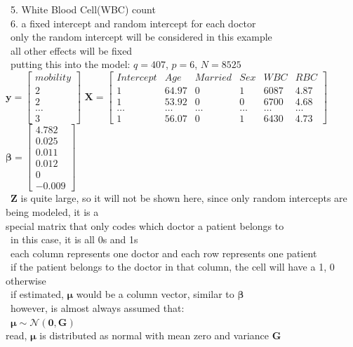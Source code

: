\documentclass[10pt,letterpaper]{scrartcl}
\newcommand{\tbul}{\textbullet}
\newcommand{\tend}{\>\textendash}
\begin{document}
\begin{tabbing}
\>\ 5. White Blood Cell(WBC) count \\
\>\ 6. a fixed intercept and random intercept for each doctor \\
\tbul\ only the random intercept will be considered in this example \\
\tbul\ all other effects will be fixed \\
\tbul\ putting this into the model: $q = 407$, $p = 6$, $N = 8525$\\
$\mathbf{y} = \begin{bmatrix} mobility \\ 2 \\ 2 \\ \ldots \\ 3 \end{bmatrix}$ 
$\mathbf{X} = \begin{bmatrix} Intercept & Age    & Married & Sex    & WBC    & RBC    \\ 
                                        1         & 64.97  & 0       & 1      & 6087   & 4.87   \\
                                        1         & 53.92  & 0       & 0      & 6700   & 4.68   \\ 
                                        \ldots    & \ldots & \ldots  & \ldots & \ldots & \ldots \\ 
                                        1         & 56.07  & 0       & 1      & 6430   & 4.73   \end{bmatrix}$
$\boldsymbol{\beta} = \begin{bmatrix} 4.782 \\ 0.025 \\ 0.011 \\ 0.012 \\ 0 \\ -0.009 \end{bmatrix}$ \\
\tbul\ $\mathbf{Z}$ is quite large, so it will not be shown here, since only random intercepts are being modeled, it is a\\ special matrix that only codes which doctor a patient belongs to \\
    \tend\ in this case, it is all 0s and 1s \\
    \tend\ each column represents one doctor and each row represents one patient \\
    \tend\ if the patient belongs to the doctor in that column, the cell will have a 1, 0 otherwise \\
\tbul\ if estimated, $\boldsymbol{\mu}$ would be a column vector, similar to $\boldsymbol{\beta}$ \\
\tbul\ however, is almost always assumed that: \\
\>\>\>\>\ $\boldsymbol{\mu} \sim \mathcal{N}(\mathbf{0}, \mathbf{G})$ \\ 
read, $\boldsymbol{\mu}$ is distributed as normal with mean zero and variance $\mathbf{G}$ \\
\end{tabbing}
\end{document}
